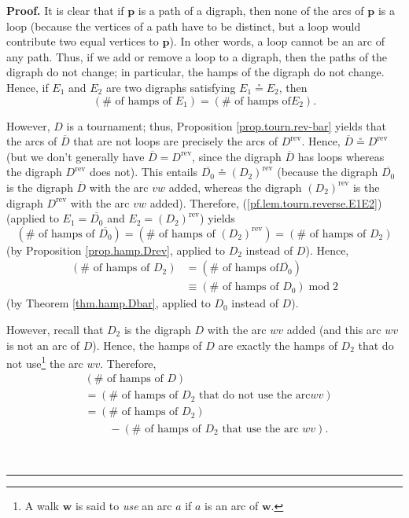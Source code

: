 \documentclass[numbers=enddot,12pt,final,onecolumn,notitlepage]{scrartcl}%
\numberwithin{exer}{subsection}
\theoremstyle{definition}
\newenvironment{proof}[1][Proof]{\noindent\textbf{#1.} }{\ \rule{0.5em}{0.5em}}
\begin{document}
\begin{proof}
It is clear that if $\mathbf{p}$ is a path of a digraph, then none of the arcs
of $\mathbf{p}$ is a loop (because the vertices of a path have to be distinct,
but a loop would contribute two equal vertices to $\mathbf{p}$). In other
words, a loop cannot be an arc of any path. Thus, if we add or remove a loop
to a digraph, then the paths of the digraph do not change; in particular, the
hamps of the digraph do not change. Hence, if $E_{1}$ and $E_{2}$ are two
digraphs satisfying $E_{1}\overset{\circ}{=}E_{2}$, then%
\begin{equation}
\left(  \#\text{ of hamps of }E_{1}\right)  =\left(  \#\text{ of hamps of
}E_{2}\right)  . \label{pf.lem.tourn.reverse.E1E2}%
\end{equation}


However, $D$ is a tournament; thus, Proposition \ref{prop.tourn.rev-bar}
yields that the arcs of $\overline{D}$ that are not loops are precisely the
arcs of $D^{\operatorname*{rev}}$. Hence, $\overline{D}\overset{\circ
}{=}D^{\operatorname*{rev}}$ (but we don't generally have $\overline
{D}=D^{\operatorname*{rev}}$, since the digraph $\overline{D}$ has loops
whereas the digraph $D^{\operatorname*{rev}}$ does not). This entails
$\overline{D_{0}}\overset{\circ}{=}\left(  D_{2}\right)  ^{\operatorname*{rev}%
}$ (because the digraph $\overline{D_{0}}$ is the digraph $\overline{D}$ with
the arc $vw$ added, whereas the digraph $\left(  D_{2}\right)
^{\operatorname*{rev}}$ is the digraph $D^{\operatorname*{rev}}$ with the arc
$vw$ added). Therefore, (\ref{pf.lem.tourn.reverse.E1E2}) (applied to
$E_{1}=\overline{D_{0}}$ and $E_{2}=\left(  D_{2}\right)
^{\operatorname*{rev}}$) yields%
\[
\left(  \#\text{ of hamps of }\overline{D_{0}}\right)  =\left(  \#\text{ of
hamps of }\left(  D_{2}\right)  ^{\operatorname*{rev}}\right)  =\left(
\#\text{ of hamps of }D_{2}\right)
\]
(by Proposition \ref{prop.hamp.Drev}, applied to $D_{2}$ instead of $D$).
Hence,%
\begin{align}
\left(  \#\text{ of hamps of }D_{2}\right)   &  =\left(  \#\text{ of hamps of
}\overline{D_{0}}\right) \nonumber\\
&  \equiv\left(  \#\text{ of hamps of }D_{0}\right)  \operatorname{mod}2
\label{pf.lem.tourn.reverse.mod2}%
\end{align}
(by Theorem \ref{thm.hamp.Dbar}, applied to $D_{0}$ instead of $D$).

However, recall that $D_{2}$ is the digraph $D$ with the arc $wv$ added (and
this arc $wv$ is not an arc of $D$). Hence, the hamps of $D$ are exactly the
hamps of $D_{2}$ that do not use\footnote{A walk $\mathbf{w}$ is said to
\emph{use} an arc $a$ if $a$ is an arc of $\mathbf{w}$.} the arc $wv$.
Therefore,%
\begin{align}
&  \left(  \#\text{ of hamps of }D\right) \nonumber\\
&  =\left(  \#\text{ of hamps of }D_{2}\text{ that do not use the arc
}wv\right) \nonumber\\
&  =\left(  \#\text{ of hamps of }D_{2}\right) \nonumber\\
&  \ \ \ \ \ \ \ \ \ \ -\left(  \#\text{ of hamps of }D_{2}\text{ that use the
arc }wv\right)  . \label{pf.lem.tourn.reverse.eq1}%
\end{align}



\end{proof}
\end{document}
